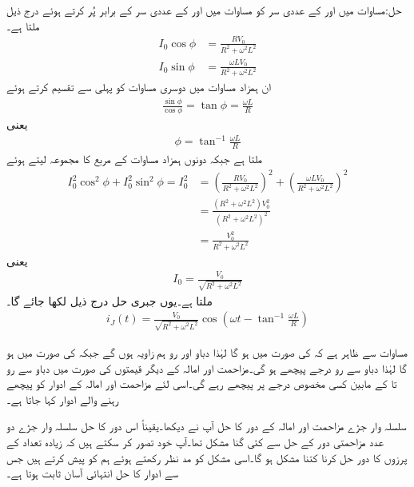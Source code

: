حل:مساوات  میں  اور  کے عددی سر کو مساوات  میں  اور  کے عددی سر کے برابر پُر کرتے ہوئے درج ذیل ملتا ہے۔
\begin{align*}
I_0 \cos \phi&=\frac{R V_0}{R^2+\omega^2 L^2}\\
I_0 \sin \phi&=\frac{\omega L V_0}{R^2+\omega^2 L^2}
\end{align*}
ان ہمزاد مساوات میں دوسری مساوات کو پہلی سے تقسیم کرتے ہوئے
\begin{align*}
\frac{\sin \phi}{\cos \phi}=\tan \phi=\frac{\omega L}{R}
\end{align*}
یعنی
\begin{align}
\phi=\tan^{-1}{\frac{\omega L}{R}}
\end{align}
ملتا ہے جبکہ دونوں ہمزاد مساوات کے مربع کا مجموعہ لیتے ہوئے
\begin{align*}
I_0^2 \cos^2 \phi+I_0^2 \sin^2 \phi=I_0^2&=\left(\frac{R V_0}{R^2+\omega^2 L^2}\right)^2+\left(\frac{\omega L V_0}{R^2+\omega^2 L^2}\right)^2 \\
&=\frac{(R^2+\omega^2 L^2)V_0^2}{(R^2+\omega^2 L^2)^2}\\
&=\frac{V_0^2}{R^2+\omega^2 L^2}
\end{align*}
یعنی
\begin{align}
I_0=\frac{V_0}{\sqrt{R^2+\omega^2 L^2}}
\end{align}
ملتا ہے۔یوں جبری حل درج ذیل لکھا جائے گا۔
\begin{align}\label{مساوات_بدلتا_جبری_حل_امالہ_مزاحمت}
i_J(t)=\frac{V_0}{\sqrt{R^2+\omega^2 L^2}} \cos \left(\omega t -\tan^{-1}{\frac{\omega L}{R}}\right)
\end{align}

مساوات  سے ظاہر ہے کہ  کی صورت میں  ہو گا لہٰذا دباو اور رو ہم زاویہ ہوں گے جبکہ  کی صورت میں  ہو گا لہٰذا دباو سے رو  درجے پیچھے ہو گی۔مزاحمت اور امالہ کے دیگر قیمتوں کی صورت میں دباو سے رو  تا  کے مابین کسی مخصوص  درجے پر پیچھے رہے گی۔اسی لئے مزاحمت اور امالہ کے ادوار کو پیچھے رہنے والے ادوار کہا جاتا ہے۔

سلسلہ وار جڑے مزاحمت اور امالہ کے دور کا حل آپ نے دیکھا۔یقیناً اس دور کا حل سلسلہ وار جڑے دو عدد مزاحمتی دور کے حل سے کئی گنا مشکل تھا۔آپ خود تصور کر سکتے ہیں کہ زیادہ تعداد کے پرزوں کا دور حل کرنا کتنا مشکل ہو گا۔اسی مشکل کو مد نظر رکھتے ہوئے ہم  کو پیش کرتے ہیں جس سے ادوار کا حل انتہائی آسان ثابت ہوتا ہے۔

